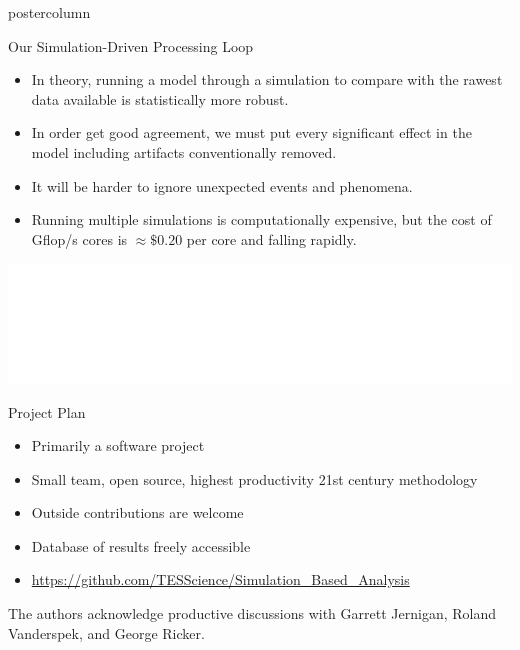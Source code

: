 \documentclass[final,hyperref={pdfpagelabels=false}]{beamer}
\begin{document}
\begin{frame}
\begin{columns}
\begin{column}{.49\textwidth}
\begin{beamercolorbox}[center,wd=\textwidth]{postercolumn}
\begin{minipage}[T]{.95\textwidth}
{            \vspace{2cm}
            \begin{block}{Our Simulation-Driven Processing Loop}
            \begin{itemize}
            \item  In theory, running a model through a simulation to compare with the rawest data available is statistically more robust.
            \item In order get good agreement, we must put every significant effect in the model including artifacts conventionally removed.
            \item It will be harder to ignore unexpected events and phenomena.
            \item Running multiple simulations is computationally expensive, but the cost of Gflop/s cores is $\approx\$0.20$ per core and falling rapidly.
            \end{itemize}
              \begin{center}
              \includegraphics[width=0.75\linewidth]{figures/Our_Pipeline.pdf}
              \end{center}
            \end{block}
            \begin{block}{Project Plan}
            \begin{itemize}
		\item Primarily a software project
		\item Small team, open source, highest productivity 21st century methodology
		\item Outside contributions are welcome
		\item Database of results freely accessible
		\item \url{https://github.com/TESScience/Simulation_Based_Analysis}
	    \end{itemize}
	    \vspace{1cm}
The authors acknowledge productive discussions with Garrett Jernigan, Roland Vanderspek, and George Ricker.
            \end{block}
          }
        \end{minipage}
      \end{beamercolorbox}
    \end{column}


\end{columns}
\end{frame}
\end{document}
